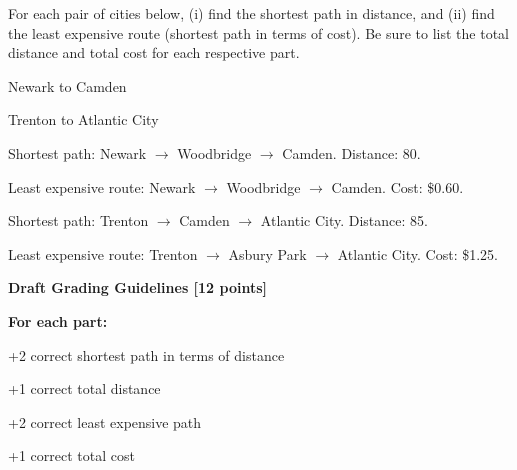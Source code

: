 \documentclass[12pt]{exam}
\begin{document}
For each pair of cities below, (i) find the shortest path in distance, and (ii) find the least expensive route (shortest path in terms of cost). Be sure to list the total distance and total cost for each respective part.

\begin{qparts}
    \item Newark to Camden
    \item Trenton to Atlantic City
\end{qparts}

\begin{solution}
\begin{qparts}
    \item \begin{qsubparts}
        \item Shortest path: Newark $\rightarrow$ Woodbridge $\rightarrow$ Camden. Distance: 80.
        \item Least expensive route: Newark $\rightarrow$ Woodbridge $\rightarrow$ Camden. Cost: \$0.60.
    \end{qsubparts}

    \item \begin{qsubparts}
        \item Shortest path: Trenton $\rightarrow$ Camden $\rightarrow$ Atlantic City. Distance: 85.
        \item Least expensive route: Trenton $\rightarrow$ Asbury Park $\rightarrow$ Atlantic City. Cost: \$1.25.
    \end{qsubparts}
\end{qparts}

\smallskip
\textbf{Draft Grading Guidelines [12 points]}

\textbf{For each part:}
\begin{guidelines}
    \item +2 correct shortest path in terms of distance
    \item +1 correct total distance
    \item +2 correct least expensive path
    \item +1 correct total cost
\end{guidelines}
\end{solution}
\end{document}
